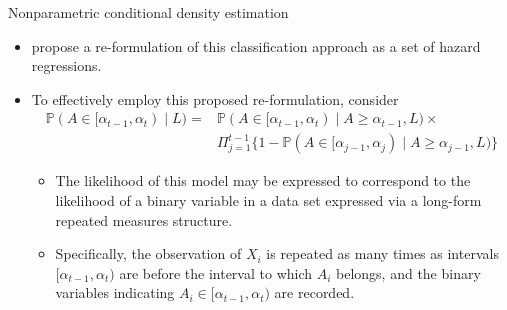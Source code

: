\documentclass{beamer}
\newcommand{\pr}{\mathbb{P}}
\begin{document}
\begin{frame}[c]{Nonparametric conditional density estimation}

\begin{center}
\begin{itemize}
  \itemsep8pt
  \item \cite{diaz2011super} propose a re-formulation of this classification
    approach as a set of hazard regressions.
  \item To effectively employ this proposed re-formulation, consider
    \begin{align*}
      \pr (A \in [\alpha_{t-1}, \alpha_t) \mid L) =& \pr (A \in [\alpha_{t-1},
      \alpha_t) \mid A \geq \alpha_{t-1}, L) \times  \\ & \Pi_{j = 1}^{t -1}
      \{1 - \pr (A \in [\alpha_{j-1}, \alpha_j) \mid A \geq \alpha_{j-1}, L) \}
    \end{align*}
    \vspace{0.25em}
    \begin{itemize}
      \itemsep4pt
      \item The likelihood of this model may be expressed to correspond to the
        likelihood of a binary variable in a data set expressed via a long-form
        repeated measures structure.
      \item Specifically, the observation of $X_i$ is repeated as many times as
        intervals $[\alpha_{t-1}, \alpha_t)$ are before the interval to which
        $A_i$ belongs, and the binary variables indicating $A_i \in
        [\alpha_{t-1}, \alpha_t)$ are recorded.
    \end{itemize}
\end{itemize}
\end{center}

\note{
}

\end{frame}

\end{document}
